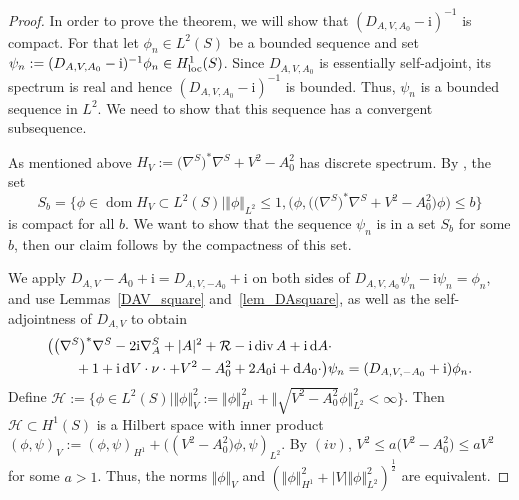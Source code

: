 \documentclass[10pt,a4paper]{amsart}
\numberwithin{equation}{section}
\begin{document}
\begin{proof} In order to prove the theorem, we will show that $(D_{A,V, A_0}-\mathrm{i})^{-1}$ is compact. For that let $\phi_n\in L^2(S)$ be a bounded sequence and set $\psi_n:= (D_{A,V, A_0}-\mathrm{i})^{-1}\phi_n \in H^1_{\rm loc}(S)$.
Since $D_{A,V, A_0}$ is essentially self-adjoint, its spectrum is real and hence $(D_{A,V, A_0}-\mathrm{i})^{-1}$ is bounded. Thus, $\psi_n$ is a bounded sequence in $L^2$. We need to show that this sequence has a convergent subsequence.
	
As mentioned above ${H}_V:= \bigl(\nabla^S\bigr)^*\nabla^S + V^2-A_0^2$ has discrete spectrum. By \cite[Theorem~XIII.64]{RS4}, the set
\[S_b=\bigl\{\phi\in \operatorname{dom}  {H}_V  \subset  L^2(S)\mid \Vert \phi\Vert_{L^2}\leq 1, \bigl(\phi, \bigl(\bigl(\nabla^S\bigr)^*\nabla^S + {V}^2-A_0^2\bigr)\phi\bigr)\leq b \bigr\}\]
is compact for all $b$. We want to show that the sequence $\psi_n$ is in a set $S_b$ for some $b$, then our claim follows by the compactness of this set.
		
We apply $D_{A,V} -A_0 + \mathrm{i}= D_{A,V,-A_0} + \mathrm{i}$ on both sides of $D_{A,V,A_0} \psi_n - {\mathrm{i}}  \psi_n =\phi_n$, and use Lemmas~\ref{DAV_square} and~\ref{lem_DAsquare}, as well as the self-adjointness of $D_{A,V}$ to obtain
\begin{align*}
& \bigl( \bigl(\nabla^S\bigr)^* \nabla^S -2{\mathrm{i}}  \nabla^S_A + |A|^2 + \mathcal{R} -\mathrm{i}  \operatorname{div} A +{\mathrm{i}}\, {\rm d}A\cdot \\
& \qquad {}+ 1+ {\mathrm{i}} \, {\rm d}V\cdot \nu\cdot +V^2 - A_0^2 +2A_0\mathrm{i}+ {\rm d}A_0\cdot \bigr)\psi_n= (D_{A,V, -A_0} +\mathrm{i})\phi_n.\end{align*}
Define
$\mathcal{H} := \bigl\{ \phi \in L^2(S)\mid \Vert \phi\Vert_{{V}}^2:= \Vert \phi\Vert_{H^1}^2 + \bigl\Vert \sqrt{{V^2}-A_0^2}\phi\bigr\Vert_{L^2}^2<\infty \bigr\}$. Then $\mathcal{H}\subset H^1(S)$ is a Hilbert space with inner product $(\phi, \psi)_{{V}}:= (\phi, \psi)_{H^1}+\bigl(({V}^2-A_0^2\bigr)\phi, \psi)_{L^2}$. By $(iv)$, $V^2\leq a\bigl(V^2-A_0^2\bigr)\leq a V^2$ for some $a>1$. Thus, the norms $\Vert \phi\Vert_{{V}}$ and $(\Vert \phi\Vert_{H^1}^2 + |V| \Vert\phi\Vert_{L^2}^2)^\frac{1}{2}$ are equivalent.
	

\end{proof}
\end{document}
